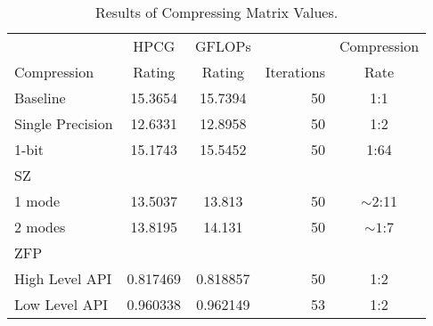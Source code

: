 \begin{table}
	\centering
	\begin{tabular}{l|S[table-format=2.6]|S[table-format=2.6]|r|c}
		            & {HPCG}   & {GFLOPs} &            & Compression \\
		Compression & {Rating} & {Rating} & Iterations & Rate \\
		\hline
		Baseline & 15.3654 & 15.7394 & 50 & 1:1 \\ %
		Single Precision & 12.6331 & 12.8958 & 50 & 1:2 \\
		1-bit & 15.1743 & 15.5452 & 50 & 1:64 \\ %
		SZ & & & & \\
		\hspace{3mm} 1 mode & 13.5037 & 13.813 & 50 & \(\sim 2\):11 \\
		\hspace{3mm} 2 modes & 13.8195 & 14.131 & 50 & \(\sim 1\):7 \\
		ZFP & & & & \\
		\hspace{3mm}High Level API & 0.817469 & 0.818857 & 50 & 1:2 \\
		\hspace{3mm}Low Level API & 0.960338 & 0.962149 & 53 & 1:2 \\
	\end{tabular}
	\caption{Results of Compressing Matrix Values.}
	\label{tab:results-val}
\end{table}